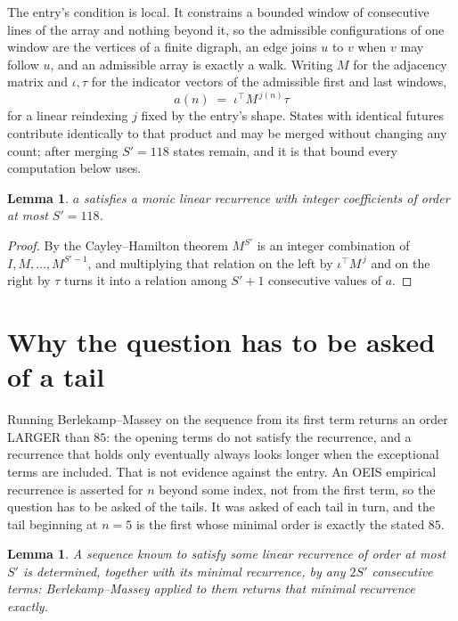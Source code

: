 \documentclass[11pt,a4paper]{article}
\theoremstyle{plain}
\newtheorem{lemma}[theorem]{Lemma}
\theoremstyle{definition}
\begin{document}
The entry's condition is local. It constrains a bounded window of consecutive lines of the
array and nothing beyond it, so the admissible configurations of one window are the vertices of
a finite digraph, an edge joins $u$ to $v$ when $v$ may follow $u$, and an admissible array is
exactly a walk. Writing $M$ for the adjacency matrix and $\iota,\tau$ for the indicator vectors
of the admissible first and last windows,
\[
a(n)\;=\;\iota^{\!\top}M^{\,j(n)}\tau
\]
for a linear reindexing $j$ fixed by the entry's shape. States with identical futures
contribute identically to that product and may be merged without changing any count; after
merging $S'=118$ states remain, and it is that bound every computation below uses.

\begin{lemma}\label{lem:cf}
$a$ satisfies a monic linear recurrence with integer coefficients of order at most $S'=118$.
\end{lemma}

\begin{proof}
By the Cayley--Hamilton theorem $M^{S'}$ is an integer combination of $I,M,\dots,M^{S'-1}$,
and multiplying that relation on the left by $\iota^{\!\top}M^{\,j}$ and on the right by
$\tau$ turns it into a relation among $S'+1$ consecutive values of $a$.
\end{proof}

\section{Why the question has to be asked of a tail}

Running Berlekamp--Massey on the sequence from its first term returns an order LARGER than $85$: the opening terms do not satisfy the recurrence, and a recurrence that holds only eventually always looks longer when the exceptional terms are included. That is not evidence against the entry. An OEIS empirical recurrence is asserted for $n$ beyond some index, not from the first term, so the question has to be asked of the tails. It was asked of each tail in turn, and the tail beginning at $n=5$ is the first whose minimal order is exactly the stated $85$.

\begin{lemma}\label{lem:bm}
A sequence known to satisfy some linear recurrence of order at most $S'$ is determined,
together with its minimal recurrence, by any $2S'$ consecutive terms: Berlekamp--Massey applied
to them returns that minimal recurrence exactly.
\end{lemma}
\end{document}
